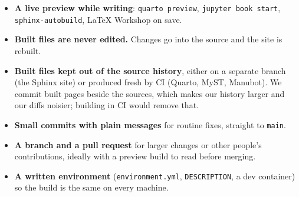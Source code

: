 \begin{itemize}
\item \textbf{A live preview while writing}: \texttt{quarto preview}, \texttt{jupyter book start}, \texttt{sphinx-autobuild}, LaTeX Workshop on save.
\item \textbf{Built files are never edited.} Changes go into the source and the site is rebuilt.
\item \textbf{Built files kept out of the source history}, either on a separate branch (the Sphinx site) or produced fresh by CI (Quarto, MyST, Manubot). We commit built pages beside the sources, which makes our history larger and our diffs noisier; building in CI would remove that.
\item \textbf{Small commits with plain messages} for routine fixes, straight to \texttt{main}.
\item \textbf{A branch and a pull request} for larger changes or other people's contributions, ideally with a preview build to read before merging.
\item \textbf{A written environment} (\texttt{environment.yml}, \texttt{DESCRIPTION}, a dev container) so the build is the same on every machine.
\end{itemize}
